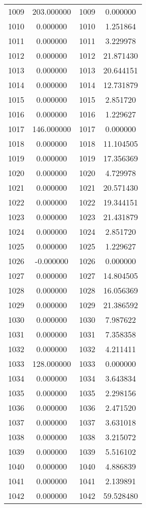 \documentclass[12pt]{article}
\begin{document}
\begin{longtable}{@{}cccc@{}}
1009 & 203.000000 & 1009 & 0.000000 \\
1010 & 0.000000 & 1010 & 1.251864 \\
1011 & 0.000000 & 1011 & 3.229978 \\
1012 & 0.000000 & 1012 & 21.871430 \\
1013 & 0.000000 & 1013 & 20.644151 \\
1014 & 0.000000 & 1014 & 12.731879 \\
1015 & 0.000000 & 1015 & 2.851720 \\
1016 & 0.000000 & 1016 & 1.229627 \\
1017 & 146.000000 & 1017 & 0.000000 \\
1018 & 0.000000 & 1018 & 11.104505 \\
1019 & 0.000000 & 1019 & 17.356369 \\
1020 & 0.000000 & 1020 & 4.729978 \\
1021 & 0.000000 & 1021 & 20.571430 \\
1022 & 0.000000 & 1022 & 19.344151 \\
1023 & 0.000000 & 1023 & 21.431879 \\
1024 & 0.000000 & 1024 & 2.851720 \\
1025 & 0.000000 & 1025 & 1.229627 \\
1026 & -0.000000 & 1026 & 0.000000 \\
1027 & 0.000000 & 1027 & 14.804505 \\
1028 & 0.000000 & 1028 & 16.056369 \\
1029 & 0.000000 & 1029 & 21.386592 \\
1030 & 0.000000 & 1030 & 7.987622 \\
1031 & 0.000000 & 1031 & 7.358358 \\
1032 & 0.000000 & 1032 & 4.211411 \\
1033 & 128.000000 & 1033 & 0.000000 \\
1034 & 0.000000 & 1034 & 3.643834 \\
1035 & 0.000000 & 1035 & 2.298156 \\
1036 & 0.000000 & 1036 & 2.471520 \\
1037 & 0.000000 & 1037 & 3.631018 \\
1038 & 0.000000 & 1038 & 3.215072 \\
1039 & 0.000000 & 1039 & 5.516102 \\
1040 & 0.000000 & 1040 & 4.886839 \\
1041 & 0.000000 & 1041 & 2.139891 \\
1042 & 0.000000 & 1042 & 59.528480 \\

\end{longtable}
\end{document}

